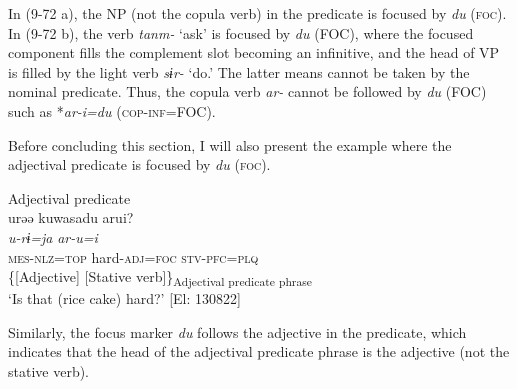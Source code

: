 In (9-72 a), the NP (not the copula verb) in the predicate is focused by \textit{du} (\textsc{foc}). In (9-72 b), the verb \textit{tanm-} ‘ask’ is focused by \textit{du} (FOC), where the focused component fills the complement slot becoming an infinitive, and the head of VP is filled by the light verb \textit{sɨr-} ‘do.’ The latter means cannot be taken by the nominal predicate. Thus, the copula verb \textit{ar-} cannot be followed by \textit{du} (FOC) such as *\textit{ar-i=du} (\textsc{cop}-\textsc{inf}=FOC).

Before concluding this section, I will also present the example where the adjectival predicate is focused by \textit{du} (\textsc{foc}).

\ea   Adjectival predicate \label{ex:9.73}\\
 \gllll  urəə  kuwasadu  arui?\\
    \textit{u-rɨ=ja}  \textit{}  \textit{ar-u=i}\\
    \textsc{mes}-\textsc{nlz}=\textsc{top}  hard-\textsc{adj}=\textsc{foc}  \textsc{stv}-\textsc{pfc}=\textsc{plq}\\
    {}  \{[Adjective]  {[Stative verb]\}\textsubscript{Adjectival predicate phrase}}\\
    \glt     ‘Is that (rice cake) hard?’ [El: 130822]
\z

Similarly, the focus marker \textit{du} follows the adjective in the predicate, which indicates that the head of the adjectival predicate phrase is the adjective (not the stative verb).
